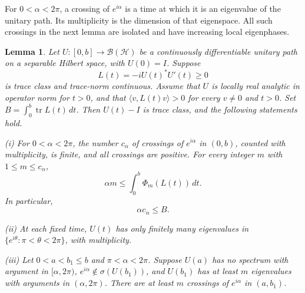 \documentclass[11pt]{amsart}
\numberwithin{equation}{section}
\newtheorem{lemma}[theorem]{Lemma}
\newcommand{\Hh}{\mathcal H}
\newcommand{\Id}{I}
\newcommand{\tr}{\operatorname{tr}}
\newcommand{\ip}[2]{\langle #1,#2\rangle}
\begin{document}
For $0<\alpha<2\pi$, a crossing of $e^{i\alpha}$ is a time at which
it is an eigenvalue of the unitary path. Its multiplicity is the
dimension of that eigenspace. All such crossings in the next lemma
are isolated and have increasing local eigenphases.

\begin{lemma}\label{lem:phase}
Let $U:[0,b]\to\mathcal B(\Hh)$ be a continuously differentiable
unitary path on a separable Hilbert space, with $U(0)=\Id$.
Suppose
\[
 L(t)=-iU(t)^*U'(t)\ge0
\]
is trace class and trace-norm continuous. Assume that $U$ is locally
real analytic in operator norm for $t>0$, and that
$\ip v{L(t)v}>0$ for every $v\ne0$ and $t>0$.
Set $B=\int_0^b\tr L(t)\,dt$.
Then $U(t)-\Id$ is trace class, and the following statements hold.

\smallskip\noindent
\textup{(i)} For $0<\alpha<2\pi$, the number $c_\alpha$ of crossings
of $e^{i\alpha}$ in $(0,b)$, counted with multiplicity, is finite,
and all crossings are positive. For every integer $m$ with
$1\le m\le c_\alpha$,
\begin{equation}\label{eq:fan-cost}
 \alpha m\le\int_0^b\Phi_m(L(t))\,dt.
\end{equation}
In particular,
\begin{equation}\label{eq:cost}
 \alpha c_\alpha\le B.
\end{equation}

\smallskip\noindent
\textup{(ii)} At each fixed time, $U(t)$ has only finitely many
eigenvalues in $\{e^{i\theta}:\pi<\theta<2\pi\}$, with multiplicity.

\smallskip\noindent
\textup{(iii)} Let $0<a<b_1\le b$ and $\pi<\alpha<2\pi$.
Suppose $U(a)$ has no spectrum with argument in $[\alpha,2\pi)$,
$e^{i\alpha}\notin\sigma(U(b_1))$, and $U(b_1)$ has at least $m$
eigenvalues with arguments in $(\alpha,2\pi)$. There are at least
$m$ crossings of $e^{i\alpha}$ in $(a,b_1)$.
\end{lemma}
\end{document}
